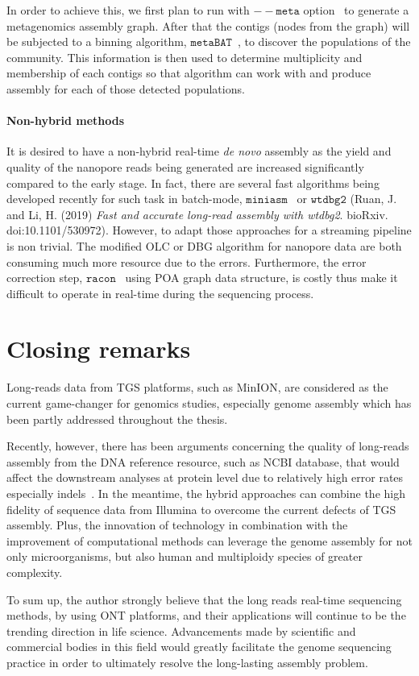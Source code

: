In order to achieve this, we first plan to run \spades{} with $\mathtt{--meta}$ option~\cite{Nurk2017metaspades} to generate a metagenomics assembly graph. After that the contigs (nodes from the graph) will be subjected to a binning algorithm, \EG{} $\mathtt{metaBAT}$~\cite{Kang2015metabat}, to discover the populations of the community.
This information is then used to determine multiplicity and membership of each contigs so that \npgraph{} algorithm can work with and produce assembly for each of those detected populations.

\paragraph{Non-hybrid methods}
It is desired to have a non-hybrid real-time \emph{de novo} assembly as the yield and quality of the nanopore reads being generated are increased significantly compared to the early stage. 
In fact, there are several fast algorithms being developed recently for such task in batch-mode, \IE{} $\mathtt{miniasm}$~\cite{Li2016} or $\mathtt{wtdbg2}$ (Ruan, J. and Li, H. (2019) \emph{Fast and accurate long-read assembly with wtdbg2}. bioRxiv. doi:10.1101/530972).
However, to adapt those approaches for a streaming pipeline is non trivial.
The modified OLC or DBG algorithm for nanopore data are both consuming much more resource due to the errors.
Furthermore, the error correction step, \EG{} $\mathtt{racon}$~\cite{Vaser2017racon} using POA graph data structure, is costly thus make it difficult to operate in real-time during the sequencing process.
\section{Closing remarks}
Long-reads data from TGS platforms, such as MinION, are considered as the  current game-changer for genomics studies, especially genome assembly which has been partly addressed throughout the thesis.

Recently, however, there has been arguments concerning the quality of long-reads assembly from the DNA reference resource, such as NCBI database, that would affect the downstream analyses at protein level due to relatively high error rates especially indels~\cite{Watson2019errors,Koren2019reply}.
In the meantime, the hybrid approaches can combine the high fidelity of sequence data from Illumina to overcome the current defects of TGS assembly.
Plus, the innovation of technology in combination with the improvement of computational methods can leverage the genome assembly for not only microorganisms, but also human and multiploidy species of greater complexity.

To sum up, the author strongly believe that the long reads real-time sequencing methods, \EG by using ONT platforms, and their applications  will continue to be the trending direction in life science. 
Advancements made by scientific and commercial bodies in this field would greatly facilitate the genome sequencing practice in order to ultimately resolve the long-lasting assembly problem.

